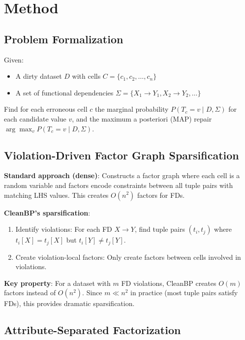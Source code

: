 \documentclass{article}
\begin{document}
\section{Method}
\label{sec:method}

\subsection{Problem Formalization}

Given:
\begin{itemize}
    \item A dirty dataset $D$ with cells $C = \{c_1, c_2, \ldots, c_n\}$
    \item A set of functional dependencies $\Sigma = \{X_1 \rightarrow Y_1, X_2 \rightarrow Y_2, \ldots\}$
\end{itemize}

Find for each erroneous cell $c$ the marginal probability $P(T_c = v \mid D, \Sigma)$ for each candidate value $v$, and the maximum a posteriori (MAP) repair $\arg\max_v P(T_c = v \mid D, \Sigma)$.

\subsection{Violation-Driven Factor Graph Sparsification}

\textbf{Standard approach (dense)}: Constructs a factor graph where each cell is a random variable and factors encode constraints between all tuple pairs with matching LHS values. This creates $O(n^2)$ factors for FDs.

\textbf{CleanBP's sparsification}: 
\begin{enumerate}
    \item Identify violations: For each FD $X \rightarrow Y$, find tuple pairs $(t_i, t_j)$ where $t_i[X] = t_j[X]$ but $t_i[Y] \neq t_j[Y]$.
    \item Create violation-local factors: Only create factors between cells involved in violations.
\end{enumerate}

\textbf{Key property}: For a dataset with $m$ FD violations, CleanBP creates $O(m)$ factors instead of $O(n^2)$. Since $m \ll n^2$ in practice (most tuple pairs satisfy FDs), this provides dramatic sparsification.

\subsection{Attribute-Separated Factorization}
\end{document}
